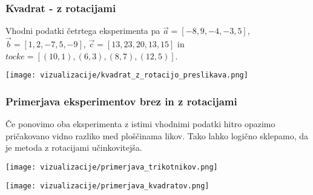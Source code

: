 \documentclass[a4paper, 12pt]{article}
\begin{document}
\subsubsection{Kvadrat - z rotacijami}
Vhodni podatki četrtega eksperimenta pa $\vec{a}=[-8,9,-4,-3,5]$, $\vec{b}=[1,2,-7,5,-9]$, $\vec{c}=[13,23,20,13,15]$ in $tocke = [(10,1),(6,3), (8,7),(12,5)]$.
\begin{center}
    \texttt{[image: vizualizacije/kvadrat\_z\_rotacijo\_preslikava.png]}\\
\end{center}

\subsubsection{Primerjava eksperimentov brez in z rotacijami}
Če ponovimo oba eksperimenta z istimi vhodnimi podatki hitro opazimo pričakovano vidno razliko med ploščinama likov.
Tako lahko logično sklepamo, da je metoda z rotacijami učinkovitejša. 
\begin{center}
    \texttt{[image: vizualizacije/primerjava\_trikotnikov.png]}\\
\end{center}
\begin{center}
    \texttt{[image: vizualizacije/primerjava\_kvadratov.png]}\\
\end{center}
\end{document}
